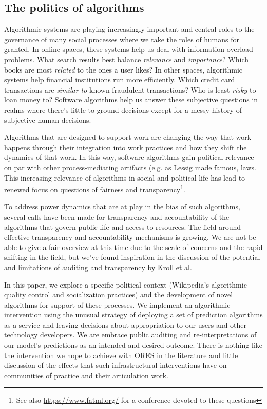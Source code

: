 \subsection{The politics of algorithms}
Algorithmic systems are playing increasingly important and central roles to the governance of many social processes where we take the roles of humans for granted\cite{gillespie2014relevance}.  In online spaces, these systems help us deal with information overload problems.  What search results best balance \emph{relevance} and \emph{importance}?  Which books are most \emph{related} to the ones a user likes?  In other spaces, algorithmic systems help financial institutions run more efficiently.  Which credit card transactions are \emph{similar to} known fraudulent transactions?  Who is least \emph{risky} to loan money to?  Software algorithms help us answer these subjective questions in realms where there's little to ground decisions except for a messy history of subjective human decisions\cite{tufekci2015algorithms}.

Algorithms that are designed to support work are changing the way that work happens through their integration into work practices and how they shift the dynamics of that work\cite{crawford2016algorithm}\cite{gillespie2014relevance}.  In this way, software algorithms gain political relevance on par with other process-mediating artifacts (e.g. as Lessig made famous, laws\cite{lessig1999code}.  This increasing relevance of algorithms in social and political life has lead to renewed focus on questions of fairness and transparency\footnote{See also \url{https://www.fatml.org/} for a conference devoted to these questions}.

To address power dynamics that are at play in the bias of such algorithms, several calls have been made for transparency and accountability of the algorithms that govern public life and access to resources\cite{diakopoulos2015algorithmic}\cite{sandvig2014auditing}\cite{kroll2016accountable}.  The field around effective transparency and accountability mechanisms is growing.  We are not be able to give a fair overview at this time due to the scale of concerns and the rapid shifting in the field, but we've found inspiration in the discussion of the potential and limitations of auditing and transparency by Kroll et al.\cite{kroll2016accountable}

In this paper, we explore a specific political context (Wikipedia's algorithmic quality control and socialization practices) and the development of novel algorithms for support of these processes.  We implement an algorithmic intervention using the unusual strategy of deploying a set of prediction algorithms as a service and leaving decisions about appropriation to our users and other technology developers.  We are embrace public auditing and re-interpretations of our model's predictions as an intended and desired outcome.  There is nothing like the intervention we hope to achieve with ORES in the literature and little discussion of the effects that such infrastructural interventions have on communities of practice and their articulation work.

